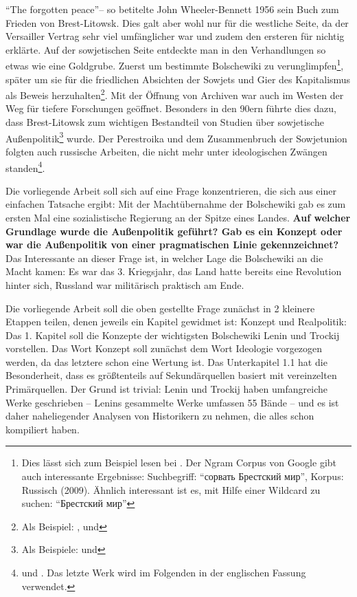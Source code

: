 \documentclass[12pt,headsepline,a4paper]{scrartcl}
\newcommand\textcyr[1]{{\fontencoding{OT2}\fontfamily{wncyr}\selectfont #1}}
\begin{document}
"`The forgotten peace"'-- so betitelte John Wheeler-Bennett 1956\autocite{wheeler1956} sein Buch zum Frieden von Brest-Litowsk. Dies galt aber wohl nur für die westliche Seite, da der Versailler Vertrag sehr viel umfänglicher war und zudem den ersteren für nichtig erklärte. Auf der sowjetischen Seite entdeckte man in den Verhandlungen so etwas wie eine Goldgrube. Zuerst um bestimmte Bolschewiki zu verunglimpfen\footnote{Dies lässt sich zum Beispiel lesen bei . Der Ngram Corpus von Google gibt auch interessante Ergebnisse: Suchbegriff: "`\textcyr{сорвать Брестский мир}"', Korpus: Russisch (2009). Ähnlich interessant ist es, mit Hilfe einer Wildcard zu suchen: "`\textcyr{* Брестский мир}"'}, später um sie für die friedlichen Absichten der Sowjets und Gier des Kapitalismus als Beweis herzuhalten\footnote{Als Beispiel: ,  und }.
Mit der Öffnung von Archiven war auch im Westen der Weg für tiefere Forschungen geöffnet. Besonders in den 90ern führte dies dazu, dass Brest-Litowsk zum wichtigen Bestandteil von Studien über sowjetische Außenpolitik\footnote{Als Beispiele:  und } wurde. Der Perestroika und  dem Zusammenbruch der Sowjetunion folgten auch russische Arbeiten, die nicht mehr unter ideologischen Zwängen standen\footnote{ und  . Das letzte Werk wird im Folgenden in der englischen Fassung verwendet.}.
  

Die vorliegende Arbeit soll sich auf eine Frage konzentrieren, die sich aus einer einfachen Tatsache ergibt: Mit der Machtübernahme der Bolschewiki gab es zum ersten Mal eine sozialistische Regierung an der Spitze eines Landes. \textbf{Auf welcher Grundlage wurde die Außenpolitik geführt? Gab es ein Konzept oder war die Außenpolitik von einer pragmatischen Linie gekennzeichnet?}
Das Interessante an dieser Frage ist, in welcher Lage die Bolschewiki an die Macht kamen: Es war das 3. Kriegsjahr, das Land hatte bereits eine Revolution hinter sich, Russland war militärisch praktisch am Ende.

Die vorliegende Arbeit soll die oben gestellte Frage zunächst in 2 kleinere Etappen teilen, denen jeweils ein Kapitel gewidmet ist: Konzept und Realpolitik:
Das 1. Kapitel soll die Konzepte der wichtigsten Bolschewiki Lenin und Trockij vorstellen. Das Wort Konzept soll zunächst dem Wort Ideologie vorgezogen werden, da das letztere schon eine Wertung ist. Das Unterkapitel 1.1 hat die Besonderheit, dass es größtenteils auf Sekundärquellen basiert mit vereinzelten Primärquellen. Der Grund ist trivial: Lenin und Trockij haben umfangreiche Werke geschrieben -- Lenins gesammelte Werke umfassen 55 Bände -- und es ist daher naheliegender Analysen von Historikern zu nehmen, die alles schon kompiliert haben. 
\end{document}
